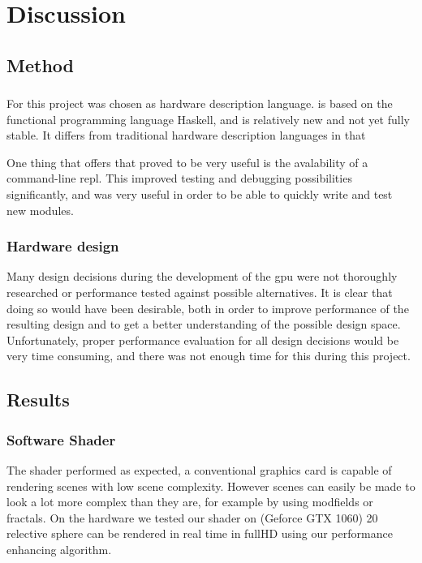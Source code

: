 \chapter{Discussion}
	
	\section{Method}
		
		\subsection{\clash}

			For this project \clash was chosen as hardware description language.
			\clash is based on the functional programming language Haskell, and
			is relatively new and not yet fully stable. It differs from 
			traditional hardware description languages in that 

			One thing that \clash offers that proved to be very useful is the 
			avalability of a command-line repl. This improved testing and 
			debugging possibilities significantly, and was very useful in order
			to be able to quickly write and test new modules.

		\subsection{Hardware design}
			
			Many design decisions during the development of the gpu were not
			thoroughly researched or performance tested against possible
			alternatives. It is clear that doing so would have been desirable,
			both in order to improve performance of the resulting design and to
			get a better understanding of the possible design space. 
			Unfortunately, proper performance evaluation for all design 
			decisions would be very time consuming, and there was not enough 
			time for this during this project.
	
	\section{Results}
		
		\subsection{Software Shader}
			The shader performed as expected, a conventional graphics card is 
			capable of rendering scenes with low scene complexity. However 
			scenes can easily be made to look a lot more complex than they are, 
			for example by using modfields or fractals. On the hardware we 
			tested our shader on (Geforce GTX 1060) 20 relective sphere can
			be rendered in real time in fullHD using our performance enhancing 
			algorithm.

